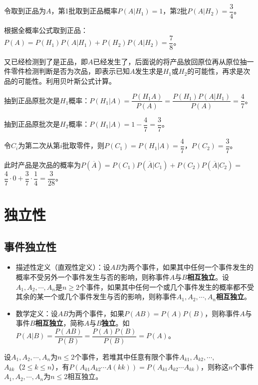 令取到正品为$A$，第1批取到正品概率$P(A|H_1)=1$，第2批$P(A|H_2)=\dfrac{3}{4}$。

根据全概率公式取到正品：$P(A)=P(H_1)P(A|H_1)+P(H_2)P(A|H_2)=\dfrac{7}{8}$。

又已经检测到了是正品，即$A$已经发生了，后面说的将产品放回原位再从原位抽一件零件检测判断是否为次品，即表示已知$A$发生求是$H_1$或$H_2$的可能性，再求是次品的可能性。利用贝叶斯公式计算。

抽到正品原批次是$H_1$概率：$P(H_1|A)=\dfrac{P(H_1A)}{P(A)}=\dfrac{P(H_1)P(A|H_1)}{P(A)}=\dfrac{4}{7}$。

抽到正品原批次是$H_2$概率：$P(H_1|A)=1-\dfrac{4}{7}=\dfrac{3}{7}$。

令$C_i$为第二次从第$i$批取零件，则$P(C_1)=P(H_1|A)=\dfrac{4}{7}$，$P(C_2)=\dfrac{3}{7}$。

此时产品是次品的概率为$P(\overline{A})=P(C_1)P(\overline{A}|C_1)+P(C_2)P(\overline{A}|C_2)=$\\$\dfrac{4}{7}\cdot0+\dfrac{3}{7}\cdot\dfrac{1}{4}=\dfrac{3}{28}$。

\section{独立性}

\subsection{事件独立性}

\begin{itemize}
    \item 描述性定义（直观性定义）：设$AB$为两个事件，如果其中任何一个事件发生的概率不受另外一个事件发生与否的影响，则称事件$A$与$B$\textbf{相互独立}。设$A_1,A_2,\cdots,A_n$是$n\geqslant2$个事件，如果其中任何一个或几个事件发生的概率都不受其余的某一个或几个事件发生与否的影响，则称事件$A_1,A_2,\cdots,A_n$\textbf{相互独立}。
    \item 数学定义：设$AB$为两个事件，如果$P(AB)=P(A)P(B)$，则称事件$A$与事件$B$\textbf{相互独立}，简称$A$与$B$\textbf{独立}。如$P(A|B)=\dfrac{P(AB)}{P(B)}=\dfrac{P(A)P(B)}{P(B)}=P(A)$。
\end{itemize}

设$A_1,A_2,\cdots,A_n$为$n\leqslant2$个事件，若堆其中任意有限个事件$A_{k1},A_{k2},\cdots,$\\$A_{kk}$（$2\leqslant k\leqslant n$），有$P(A_{k1}A_{k2}\cdots A(kk))=P(A_{k1}A_{k2}\cdots A_{kk})$，则称这$n$个事件$A_1,A_2,\cdots,A_n$为$n\leqslant2$相互独立。

